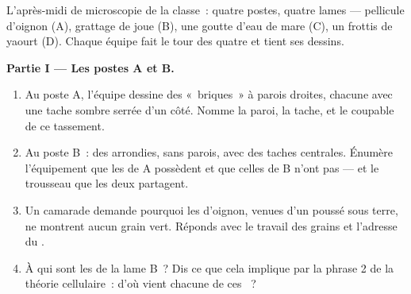 \begin{problem}\label{pb:g6:cell-unit-of-life:1}
L'après-midi de microscopie de la classe~: quatre postes, quatre
lames --- pellicule d'oignon (A), grattage de joue (B), une goutte
d'eau de mare (C), un frottis de yaourt (D). Chaque équipe fait le
tour des quatre et tient ses dessins.

\medskip\noindent\textbf{Partie I --- Les postes A et B.}
\begin{enumerate}
  \item Au poste A, l'équipe dessine des «~briques~» à parois
        droites, chacune avec une tache sombre serrée d'un côté.
        Nomme la paroi, la tache, et le coupable de ce
        tassement.
  \item Au poste B~: des  arrondies, sans parois, avec des
        taches centrales. Énumère l'équipement que les  de
        A possèdent et que celles de B n'ont pas --- et le
        trousseau que les deux partagent.
  \item Un camarade demande pourquoi les  d'oignon, venues
        d'un  poussé sous terre, ne montrent aucun grain vert.
        Réponds avec le travail des grains et l'adresse du .
  \item À qui sont les  de la lame B~? Dis ce que cela
        implique par la phrase 2 de la théorie cellulaire~: d'où
        vient chacune de ces ~?
\end{enumerate}


\end{problem}

